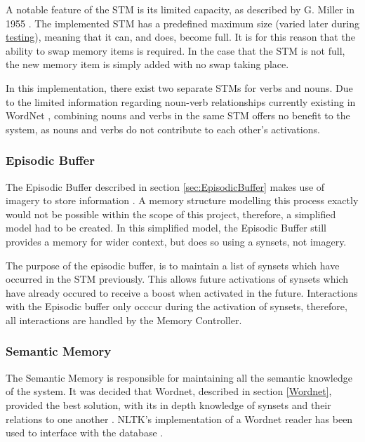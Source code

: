 \documentclass[]{article}
\begin{document}
A notable feature of the STM is its limited capacity, as described by G. Miller in 1955 \cite{SevenPlusMinusTwo}. The implemented STM has a predefined maximum size (varied later during \hyperref[sec:EvSTM]{testing}), meaning that it can, and does, become full. It is for this reason that the ability to swap memory items is required. In the case that the STM is not full, the new memory item is simply added with no swap taking place.

In this implementation, there exist two separate STMs for verbs and nouns. Due to the limited information regarding noun-verb relationships currently existing in WordNet \cite{WN2Nouns}, combining nouns and verbs in the same STM offers no benefit to the system, as nouns and verbs do not contribute to each other's activations.

\subsubsection{Episodic Buffer}
\label{sec:ImplementedEpisodicBuffer}
The Episodic Buffer described in section \ref{sec:EpisodicBuffer} makes use of imagery to store information \cite{BaddeleyEpisodicBuffer}. A memory structure modelling this process exactly would not be possible within the scope of this project, therefore, a simplified model had to be created. In this simplified model, the Episodic Buffer still provides a memory for wider context, but does so using a synsets, not imagery.

The purpose of the episodic buffer, is to maintain a list of synsets which have occurred in the STM previously. This allows future activations of synsets which have already occured to receive a boost when activated in the future. Interactions with the Episodic buffer only occcur during the activation of synsets, therefore, all interactions are handled by the Memory Controller.

\subsubsection{Semantic Memory}
\label{sec:ImplementedSemanticMemory}
The Semantic Memory is responsible for maintaining all the semantic knowledge of the system. It was decided that Wordnet, described in section \ref{Wordnet}, provided the best solution, with its in depth knowledge of synsets and their relations to one another \cite{WN2Nouns, WN4Verbs}.  NLTK's implementation of a Wordnet reader has been used to interface with the database \cite{NLTK}.
\end{document}
